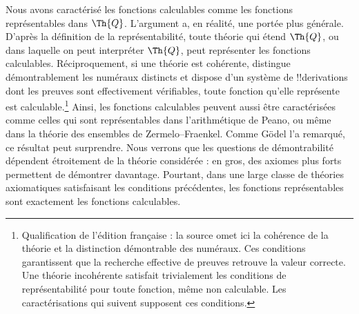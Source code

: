 \documentclass[../../../include/open-logic-section]{subfiles}
\begin{document}
\begin{explain}
Nous avons caractérisé les fonctions calculables comme
les fonctions représentables dans $\Th{Q}$.
L'argument a, en réalité, une portée plus générale.
D'après la définition de la représentabilité, toute théorie
qui étend $\Th{Q}$, ou dans laquelle on peut interpréter
$\Th{Q}$, peut représenter les fonctions calculables.
Réciproquement, si une théorie est cohérente, distingue
démontrablement les numéraux distincts et dispose d'un système
de !!{derivation}s dont les preuves sont effectivement
vérifiables, toute fonction qu'elle représente est
calculable.\footnote{Qualification de l'édition française :
la source omet ici la cohérence de la théorie et la distinction
démontrable des numéraux. Ces conditions garantissent que
la recherche effective de preuves retrouve la valeur correcte.
Une théorie incohérente satisfait trivialement les conditions
de représentabilité pour toute fonction, même non calculable.
Les caractérisations qui suivent supposent ces conditions.}
Ainsi, les fonctions calculables peuvent aussi être
caractérisées comme celles qui sont représentables dans
l'arithmétique de Peano, ou même dans la théorie des
ensembles de Zermelo--Fraenkel.
Comme Gödel l'a remarqué, ce résultat peut surprendre.
Nous verrons que les questions de démontrabilité dépendent
étroitement de la théorie considérée : en gros, des axiomes
plus forts permettent de démontrer davantage.
Pourtant, dans une large classe de théories axiomatiques
satisfaisant les conditions précédentes, les fonctions
représentables sont exactement les fonctions calculables.
\end{explain}
\end{document}
